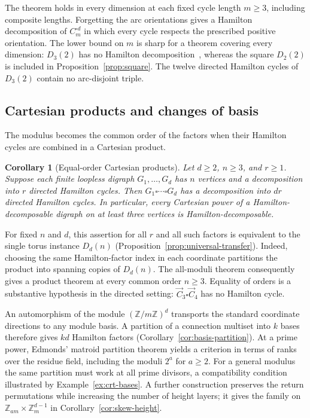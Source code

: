 \documentclass[11pt,reqno]{amsart}
\numberwithin{equation}{section}
\newtheorem{corollary}[theorem]{Corollary}
\theoremstyle{definition}
\theoremstyle{remark}
\newcommand{\Z}{\mathbb Z}
\begin{document}
The theorem holds in every dimension at each fixed cycle length
$m\ge3$, including composite lengths. Forgetting the arc orientations
gives a Hamilton decomposition of $C_m^{\square d}$ in which every cycle
respects the prescribed positive orientation. The lower bound on $m$ is sharp for a theorem covering every
dimension: $D_3(2)$ has no Hamilton decomposition~\cite{AS82binary}, whereas
the square $D_2(2)$ is included in Proposition~\ref{prop:square}.
The twelve directed Hamilton cycles of $D_3(2)$ contain no
arc-disjoint triple.

\subsection{Cartesian products and changes of basis}
The modulus becomes the common order of the factors when their Hamilton
cycles are combined in a Cartesian product.

\begin{corollary}[Equal-order Cartesian products]\label{cor:cartesian-products}
Let $d\ge2$, $n\ge3$, and $r\ge1$. Suppose each finite loopless digraph
$G_1,\ldots,G_d$ has $n$ vertices and a decomposition into $r$ directed
Hamilton cycles. Then $G_1\square\cdots\square G_d$ has a decomposition
into $dr$ directed Hamilton cycles. In particular, every Cartesian power
of a Hamilton-decomposable digraph on at least three vertices is
Hamilton-decomposable.
\end{corollary}

For fixed $n$ and $d$, this assertion for all $r$ and all such factors is
equivalent to the single torus instance $D_d(n)$
(Proposition~\ref{prop:universal-transfer}). Indeed, choosing the same
Hamilton-factor index in each coordinate partitions the product into
spanning copies of $D_d(n)$. The all-moduli theorem consequently gives a
product theorem at every common order $n\ge3$. Equality of orders is a
substantive hypothesis in the directed setting: $\vec C_3\square\vec C_4$
has no Hamilton cycle.

An automorphism of the module $(\Z/m\Z)^d$ transports the standard
coordinate directions to any module basis. A partition of a connection
multiset into $k$ bases therefore gives $kd$ Hamilton factors
(Corollary~\ref{cor:basis-partition}). At a prime power, Edmonds' matroid
partition theorem yields a criterion in terms of ranks over the residue
field, including the moduli $2^a$ for $a\ge2$. For a general modulus the
same partition must work at all prime divisors, a compatibility condition
illustrated by Example~\ref{ex:crt-bases}. A further construction preserves
the return permutations while increasing the number of height layers;
it gives the family on $\Z_{am}\times\Z_m^{d-1}$ in
Corollary~\ref{cor:skew-height}.
\end{document}
